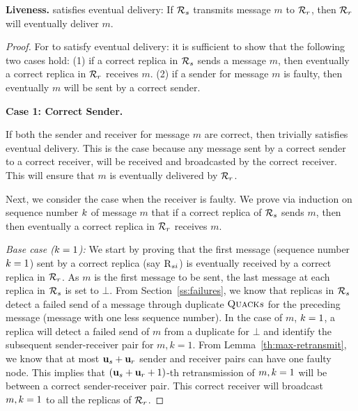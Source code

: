 \begin{theorem} \label{th:liveness}
    {\bf Liveness.} \Scrooge{} satisfies eventual delivery:
    If \RSM{} $\mathcal{R}_{s}$ transmits message $m$ to \RSM{} $\mathcal{R}_{r}$, then $\mathcal{R}_{r}$ will eventually deliver $m$.
\end{theorem}
\begin{proof}
    For \Scrooge{} to satisfy eventual delivery: 
    it is sufficient to show that the following two cases hold:
    (1) if a correct replica in \RSM{} $\mathcal{R}_{s}$ sends a message $m$, then eventually a correct replica in \RSM{} $\mathcal{R}_{r}$ receives $m$.
    (2) if a sender for message $m$ is faulty, then eventually $m$ will be sent by a correct sender. 

    {\bf Case 1: Correct Sender.}
    
    If both the sender and receiver for message $m$ are correct, then \Scrooge{} trivially satisfies eventual delivery.
    This is the case because any message sent by a correct sender to a correct receiver, 
    will be received and broadcasted by the correct receiver. 
    This will ensure that $m$ is eventually delivered by $\mathcal{R}_{r}$.
    
    Next, we consider the case when the receiver is faulty.
    We prove via induction on sequence number $k$ of message $m$ that if a correct replica of $\mathcal{R}_{s}$ sends $m$, 
    then then eventually a correct replica in \RSM{} $\mathcal{R}_{r}$ receives $m$. 
    
    {\em Base case ($k = 1$):} 
    We start by proving that the first message (sequence number $k = 1$) sent by a correct replica (say $\textsc{R}_{{s}{i}}$) 
    is eventually received by a correct replica in $\mathcal{R}_{r}$.
    As $m$ is the first message to be sent, the last  message at each replica in $\mathcal{R}_{s}$ is set to $\bot$.
    From Section~\ref{ss:failures}, we know that replicas in $\mathcal{R}_{s}$ detect a failed send of a message through duplicate $\textsc{Quack}{s}$
    for the preceding  message (message with one less sequence number). 
    In the case of $m$, $k=1$, a replica will detect a failed send of $m$ from a duplicate \quack{} for $\bot$ and 
    identify the subsequent sender-receiver pair for $m, k=1$.
    From Lemma~\ref{th:max-retransmit}, we know that at most $\textbf{u}_{s}+\textbf{u}_{r}$ sender and receiver pairs can have one faulty node.
    This implies that $(\textbf{u}_{s}+\textbf{u}_{r}+1)$-th retransmission of $m, k=1$ will be between a correct sender-receiver pair.
    This correct receiver will broadcast $m, k=1$ to all the replicas of $\mathcal{R}_{r}$.


\end{proof}
